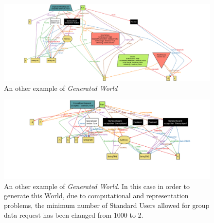  \begin{figure}[H]
 \begin{center}
   \includegraphics[width=\textwidth]{./img/alloy/alloy5.png}
   \hspace{0.05\linewidth}
   \centering
   \caption{An other example of \textit{Generated World}}
   \label{img:generatedWorld3}
 \end{center}
 \end{figure}

 \begin{figure}[H]
 \begin{center}
   \includegraphics[width=\textwidth]{./img/alloy/alloy6.png}
   \hspace{0.05\linewidth}
   \centering
   \caption{An other example of \textit{Generated World}. In this case in order to generate this World, due to computational and representation problems, the minimum number of Standard Users allowed for group data request has been changed from 1000 to 2.}
   \label{img:generatedWorld4}
 \end{center}
 \end{figure}
 \clearpage

